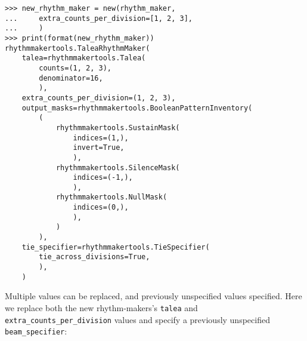 \begin{comment}
<abjad>
new_rhythm_maker = new(rhythm_maker,
    extra_counts_per_division=[1, 2, 3],
    )
print(format(new_rhythm_maker))
</abjad>
\end{comment}

\begin{abjadbookoutput}
\begin{singlespacing}
\vspace{-0.5\baselineskip}
\begin{verbatim}
>>> new_rhythm_maker = new(rhythm_maker,
...     extra_counts_per_division=[1, 2, 3],
...     )
>>> print(format(new_rhythm_maker))
rhythmmakertools.TaleaRhythmMaker(
    talea=rhythmmakertools.Talea(
        counts=(1, 2, 3),
        denominator=16,
        ),
    extra_counts_per_division=(1, 2, 3),
    output_masks=rhythmmakertools.BooleanPatternInventory(
        (
            rhythmmakertools.SustainMask(
                indices=(1,),
                invert=True,
                ),
            rhythmmakertools.SilenceMask(
                indices=(-1,),
                ),
            rhythmmakertools.NullMask(
                indices=(0,),
                ),
            )
        ),
    tie_specifier=rhythmmakertools.TieSpecifier(
        tie_across_divisions=True,
        ),
    )
\end{verbatim}
\end{singlespacing}
\end{abjadbookoutput}

\noindent Multiple values can be replaced, and previously unspecified values
specified. Here we replace both the new rhythm-makers's \texttt{talea} and
\texttt{extra\_counts\_per\_division} values and specify a previously
unspecified \texttt{beam\_specifier}:

\begin{comment}
<abjad>
new_rhythm_maker = new(new_rhythm_maker,
    talea=rhythmmakertools.Talea([2, 1], 8),
    extra_counts_per_division=[1, 0, 1, 2, 0, 1],
    beam_specifier=rhythmmakertools.BeamSpecifier(
        beam_divisions_together=True,
        ),
    )
print(format(new_rhythm_maker))
</abjad>
\end{comment}

